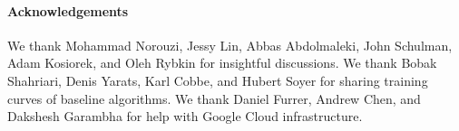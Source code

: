\paragraph{Acknowledgements}
We thank Mohammad Norouzi, Jessy Lin, Abbas Abdolmaleki, John Schulman, Adam Kosiorek, and Oleh Rybkin for insightful discussions.
We thank Bobak Shahriari, Denis Yarats, Karl Cobbe,
and Hubert Soyer for sharing training curves of baseline algorithms. We thank Daniel Furrer, Andrew Chen, and Dakshesh Garambha for help with Google Cloud infrastructure.

